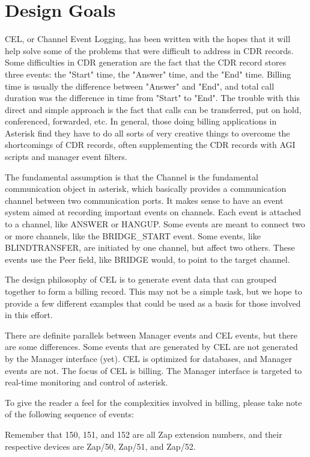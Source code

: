 
\section{Design Goals}

CEL, or Channel Event Logging, has been written with the hopes that it will help
solve some of the problems that were difficult to address in CDR records. Some
difficulties in CDR generation are the fact that the CDR record stores three
events: the "Start" time, the "Answer" time, and the "End" time. Billing time is
usually the difference between "Answer" and "End", and total call duration was
the difference in time from "Start" to "End".  The trouble with this direct and
simple approach is the fact that calls can be transferred, put on hold,
conferenced, forwarded, etc. In general, those doing billing applications in
Asterisk find they have to do all sorts of very creative things to overcome the
shortcomings of CDR records, often supplementing the CDR records with AGI
scripts and manager event filters.

The fundamental assumption is that the Channel is the fundamental communication
object in asterisk, which basically provides a communication channel between two
communication ports. It makes sense to have an event system aimed at recording
important events on channels. Each event is attached to a channel, like ANSWER
or HANGUP. Some events are meant to connect two or more channels, like the
BRIDGE\_START event. Some events, like BLINDTRANSFER, are initiated by one
channel, but affect two others. These events use the Peer field, like BRIDGE
would, to point to the target channel.

The design philosophy of CEL is to generate event data that can grouped together
to form a billing record. This may not be a simple task, but we hope to provide
a few different examples that could be used as a basis for those involved in
this effort.

There are definite parallels between Manager events and CEL events, but there
are some differences.  Some events that are generated by CEL are not generated
by the Manager interface (yet). CEL is optimized for databases, and Manager
events are not. The focus of CEL is billing. The Manager interface is targeted
to real-time monitoring and control of asterisk.

To give the reader a feel for the complexities involved in billing, please take
note of the following sequence of events:

Remember that 150, 151, and 152 are all Zap extension numbers, and their
respective devices are Zap/50, Zap/51, and Zap/52.

